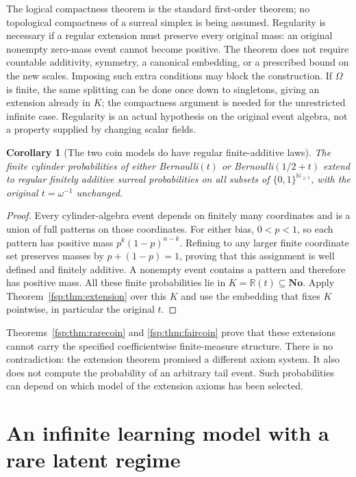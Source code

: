 \documentclass[11pt,a4paper]{article}
\numberwithin{equation}{section}
\newtheorem{corollary}[theorem]{Corollary}
\theoremstyle{definition}
\theoremstyle{remark}
\newcommand{\R}{\mathbb R}
\newcommand{\N}{\mathbb N}
\newcommand{\No}{\mathbf{No}}
\begin{document}
The logical compactness theorem is the standard first-order theorem;
no topological compactness of a surreal simplex is being assumed.
Regularity is necessary if a regular extension must preserve every
original mass: an original nonempty zero-mass event cannot become
positive. The theorem does not require countable additivity, symmetry,
a canonical embedding, or a prescribed bound on the new scales.
Imposing such extra conditions may block the construction. If $\Omega$
is finite, the same splitting can be done once down to singletons, giving
an extension already in $K$; the compactness argument is needed for the
unrestricted infinite case. Regularity is an actual hypothesis on the
original event algebra, not a property supplied by changing scalar fields.

\begin{corollary}[The two coin models do have regular finite-additive laws]
\label{fsp:cor:coinextension}
The finite cylinder probabilities of either Bernoulli$(t)$ or
Bernoulli$(1/2+t)$ extend to regular finitely additive surreal
probabilities on all subsets of $\{0,1\}^{\N_{\ge1}}$, with the original
$t=\omega^{-1}$ unchanged.
\end{corollary}
\begin{proof}
Every cylinder-algebra event depends on finitely many coordinates and
is a union of full patterns on those coordinates. For either bias,
$0<p<1$, so each pattern has positive mass $p^k(1-p)^{n-k}$.
Refining to any larger finite coordinate set preserves masses by
$p+(1-p)=1$, proving that this assignment is well defined and finitely
additive. A nonempty event contains a pattern and therefore has positive
mass. All these finite probabilities lie in $K=\R(t)\subseteq\No$.
Apply Theorem~\ref{fsp:thm:extension} over this $K$ and use the
embedding that fixes $K$ pointwise, in particular the original $t$.
\end{proof}

Theorems~\ref{fsp:thm:rarecoin} and \ref{fsp:thm:faircoin} prove that these
extensions cannot carry the specified coefficientwise finite-measure
structure. There is no contradiction: the extension theorem promised
a different axiom system. It also does not compute the probability of
an arbitrary tail event. Such probabilities can depend on which model
of the extension axioms has been selected.

\section{An infinite learning model with a rare latent regime}
\label{fsp:sec:latent}
\end{document}
